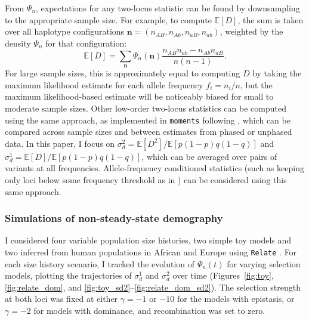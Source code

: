 \documentclass[]{article}
\newcommand{\E}{\mathbb{E}}
\begin{document}
From \(\Psi_n\), expectations for any two-locus statistic can be found by
downsampling to the appropriate sample size. For example, to compute \(\E[D]\),
the sum is taken over all haplotype configurations \(\mathbf{n} = (n_{AB},
n_{Ab}, n_{aB}, n_{ab})\), weighted by the density \(\Psi_n\) for that
configuration:
\begin{equation}
\E[D] = \sum_{\mathbf{n}} \Psi_n(\mathbf{n})
\frac{n_{AB}n_{ab} - n_{Ab}n_{aB}}{n(n-1)}.
\end{equation}
For large sample sizes, this is approximately equal to computing \(D\) by
taking the maximum likelihood estimate for each allele frequency \(f_i = n_i /
n\), but the maximum likelihood-based estimate will be noticeably biased for
small to moderate sample sizes. Other low-order two-locus statistics can be
computed using the same approach, as implemented in \texttt{moments} following
\citet{Ragsdale2020-nz}, which can be compared across sample sizes and between
estimates from phased or unphased data. In this paper, I focus on \(\sigma_d^2
= \E[D^2] / \E[p(1-p)q(1-q)]\) and \(\sigma_d^1 = \E[D] / \E[p(1-p)q(1-q)]\),
which can be averaged over pairs of variants at all frequencies.
Allele-frequency conditioned statistics (such as keeping only loci below some
frequency threshold as in \citet{Good2022-ot}) can be considered using this
same approach.

\subsubsection{Simulations of non-steady-state demography}

I considered four variable population size histories, two simple toy models and
two inferred from human populations in African and Europe using \texttt{Relate}
\citep{Speidel2019-nj}. For each size history scenario, I tracked the evolution
of \(\Psi_n(t)\) for varying selection models, plotting the trajectories of
\(\sigma_d^1\) and \(\sigma_d^2\) over time (Figures~\ref{fig:toy},
\ref{fig:relate_dom}, and \ref{fig:toy_sd2}--\ref{fig:relate_dom_sd2}). The
selection strength at both loci was fixed at either \(\gamma=-1\) or \(-10\)
for the models with epistasis, or \(\gamma=-2\) for models with dominance, and
recombination was set to zero.
\end{document}
